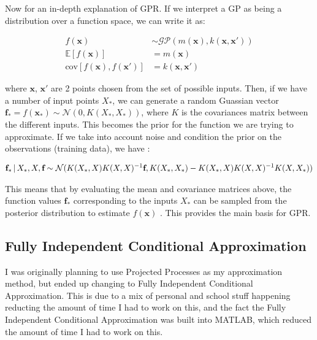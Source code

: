 \documentclass{article}
\newcommand{\vbar}{\hspace{-0.4mm} \mathrel{|} \hspace{-0.4mm}}
\begin{document}
    Now for an in-depth explanation of GPR. If we interpret a GP as being a distribution over
    a function space, we can write it as:
    
    \begin{align*}
        f(\textbf{x})                             &\sim \mathcal{GP}(m(\textbf{x}), k(\textbf{x}, \textbf{x}')) \\
        \mathbb{E}[f(\textbf{x})]                 &= m(\textbf{x})                                           \\
        \text{cov}[f(\textbf{x}), f(\textbf{x}')] &= k(\textbf{x}, \textbf{x}')
    \end{align*}
    
    where $\textbf{x}$, $\textbf{x}'$ are 2 points chosen from the set of possible inputs. Then,
    if we have a number of input points $X_{*}$, we can generate a random Guassian vector
    $\textbf{f}_{*} = f(\textbf{x}_{*}) \sim \mathcal{N}(0, K(X_{*}, X_{*}))$, where $K$ is the
    covariances matrix between the different inputs. This becomes the prior for the function
    we are trying to approximate. If we take into account noise and condition the prior on the
    observations (training data), we have \citep{gpml}:
    
    \begin{align*}
        \textbf{f}_{*} \vbar X_{*}, X, \textbf{f} \sim \mathcal{N}(K(X_{*}, X)K(X, X)^{-1} \textbf{f}, K(X_{*}, X_{*}) - K(X_{*}, X)K(X, X)^{-1} K(X, X_{*}))
    \end{align*}
    
    This means that by evaluating the mean and covariance matrices above, the function values
    $\textbf{f}_{*}$ corresponding to the inputs $X_{*}$ can be sampled from the posterior
    distribution to estimate $f(\textbf{x})$ \citep{gpml}. This provides the main basis for GPR.
    
    \subsection{Fully Independent Conditional Approximation}
    
    I was originally planning to use Projected Processes as my approximation method, but ended up
    changing to Fully Independent Conditional Approximation. This is due to a mix of personal
    and school stuff happening reducting the amount of time I had to work on this, and the fact
    the Fully Independent Conditional Approximation was built into MATLAB, which reduced the amount
    of time I had to work on this.
    
\end{document}
